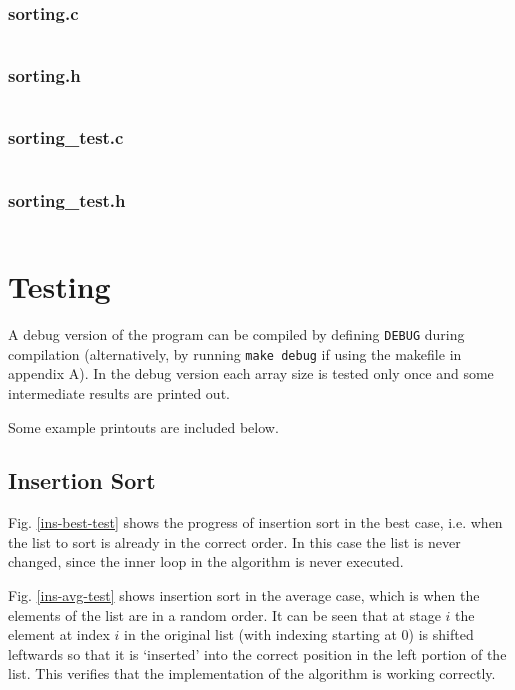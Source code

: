 \documentclass{article}
\begin{document}
\subsubsection{sorting.c}
\inputminted{c}{alg-cw1/src/sorting.c}

\subsubsection{sorting.h}
\inputminted{c}{alg-cw1/src/sorting.h}

\subsubsection{sorting\_test.c}
\inputminted{c}{alg-cw1/src/sorting_test.c}

\subsubsection{sorting\_test.h}
\inputminted{c}{alg-cw1/src/sorting_test.h}

\section{Testing}

A debug version of the program can be compiled by defining \texttt{DEBUG} during compilation (alternatively, by running \texttt{make debug} if using the makefile in appendix A). In the debug version each array size is tested only once and some intermediate results are printed out.

Some example printouts are included below.

\subsection{Insertion Sort}

Fig. \ref{ins-best-test} shows the progress of insertion sort in the best case, i.e. when the list to sort is already in the correct order. In this case the list is never changed, since the inner loop in the algorithm is never executed.

Fig. \ref{ins-avg-test} shows insertion sort in the average case, which is when the elements of the list are in a random order. It can be seen that at stage $i$ the element at index $i$ in the original list (with indexing starting at 0) is shifted leftwards so that it is `inserted' into the correct position in the left portion of the list. This verifies that the implementation of the algorithm is working correctly.
\end{document}
